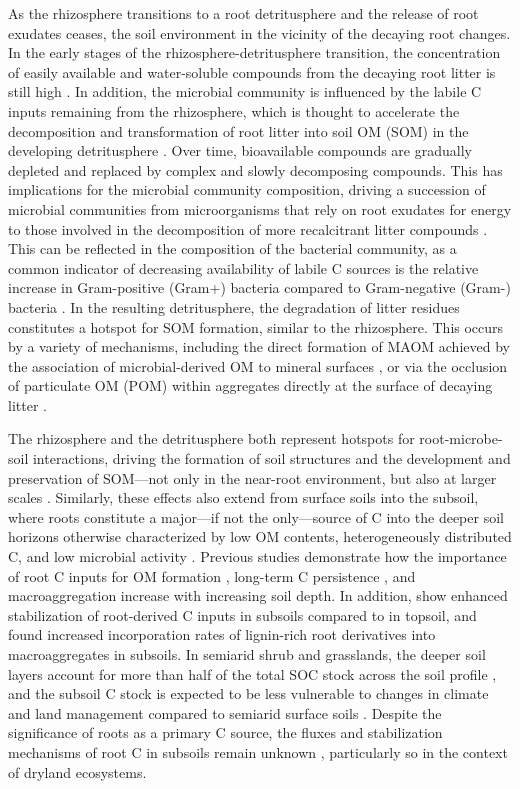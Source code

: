 As the rhizosphere transitions to a root detritusphere and the release of root exudates ceases, the soil environment in the vicinity of the decaying root changes. In the early stages of the rhizosphere-detritusphere transition, the concentration of easily available and water-soluble compounds from the decaying root litter is still high \citep{Cotrufo2015}. In addition, the microbial community is influenced by the labile C inputs remaining from the rhizosphere, which is thought to accelerate the decomposition and transformation of root litter into soil OM (SOM) in the developing detritusphere \citep{Wang2014}. Over time, bioavailable compounds are gradually depleted and replaced by complex and slowly decomposing compounds. This has implications for the microbial community composition, driving a succession of microbial communities from microorganisms that rely on root exudates for energy to those involved in the decomposition of more recalcitrant litter compounds \citep{Berg2008, Theuerl2010, Poll2010}. This can be reflected in the composition of the bacterial community, as a common indicator of decreasing availability of labile C sources is the relative increase in Gram-positive (Gram+) bacteria compared to Gram-negative (Gram-) bacteria \citep{Fanin2019}. In the resulting detritusphere, the degradation of litter residues constitutes a hotspot for SOM formation, similar to the rhizosphere. This occurs by a variety of mechanisms, including the direct formation of MAOM achieved by the association of microbial-derived OM to mineral surfaces \citep{Kopittke2020, Vidal2021}, or via the occlusion of particulate OM (POM) within aggregates directly at the surface of decaying litter \citep{Witzgall2021}.

The rhizosphere and the detritusphere both represent hotspots for root-microbe-soil interactions, driving the formation of soil structures and the development and preservation of SOM---not only in the near-root environment, but also at larger scales \citep{Richter2007}. Similarly, these effects also extend from surface soils into the subsoil, where roots constitute a major---if not the only---source of C into the deeper soil horizons otherwise characterized by low OM contents, heterogeneously distributed C, and low microbial activity \citep{Rasse2005, Chabbi2009}. Previous studies demonstrate how the importance of root C inputs for OM formation \citep{Angst2018}, long-term C persistence \citep{Eusterhues2003}, and macroaggregation \citep{Baumert2018} increase with increasing soil depth. In addition, \citet{Peixoto2020} show enhanced stabilization of root-derived C inputs in subsoils compared to in topsoil, and \citet{Wang2014} found increased incorporation rates of lignin-rich root derivatives into macroaggregates in subsoils. In semiarid shrub and grasslands, the deeper soil layers account for more than half of the total SOC stock across the soil profile \citep{Jobbagy2001}, and the subsoil C stock is expected to be less vulnerable to changes in climate and land management compared to semiarid surface soils \citep{Albaladejo2013}. Despite the significance of roots as a primary C source, the fluxes and stabilization mechanisms of root C in subsoils remain unknown \citep{Gregory2022}, particularly so in the context of dryland ecosystems.

